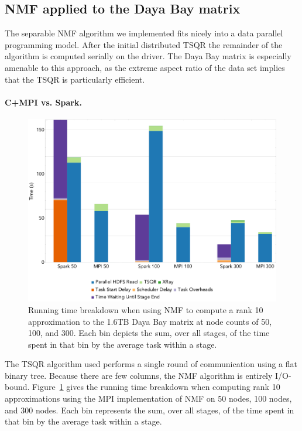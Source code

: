 \subsection{NMF applied to the Daya Bay matrix}
The separable NMF algorithm we implemented fits nicely into a data parallel programming model. After the initial distributed TSQR the remainder of the algorithm is computed serially on the driver. The Daya Bay matrix is especially amenable to this approach, as the extreme aspect ratio of the data set implies that the TSQR is particularly efficient.

\paragraph{C+MPI vs. Spark.}

\begin{figure}[thb!]
\begin{center}
\includegraphics[width=.9\textwidth]{fig/nmf_run_times.png}
\caption{Running time breakdown when using NMF to compute a rank 10 approximation to the 1.6TB Daya Bay matrix at 
  node counts of 50, 100, and 300. Each bin depicts the sum, over all stages, of the time spent in that bin by the average task within a stage.}
\label{fig:nmfrt}
\end{center}
\end{figure}

The TSQR algorithm used performs a single round of communication using a flat binary tree. Because there are few columns, the NMF algorithm is entirely I/O-bound. Figure~\ref{fig:nmfrt} gives the running time breakdown when computing rank 10 approximations using the MPI implementation of NMF on 50 nodes, 100 nodes, and 300 nodes. 
Each bin represents the sum, over all stages, of the time spent in that bin by the average task within a stage.

